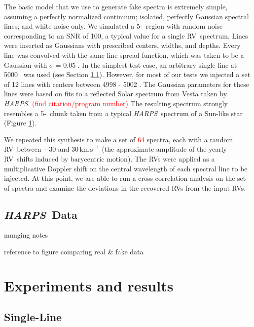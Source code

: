 \documentclass[modern]{aastex61}
\newcommand{\unit}[1]{\mathrm{#1}}
\newcommand{\km}{\unit{km}}
\newcommand{\s}{\unit{s}}
\newcommand{\kms}{\km\,\s^{-1}}
\newcommand{\ang}{\text{\normalfont\AA}}
\newcommand{\todo}[1]{\textcolor{red}{#1}}  %
\newcommand{\acronym}[1]{{\small{#1}}}
\newcommand{\project}[1]{\textsl{#1}}
\newcommand{\HARPS}{\project{\acronym{HARPS}}}
\newcommand{\RV}{\acronym{RV}}
\begin{document}
The basic model that we use to generate fake spectra is extremely simple, assuming a perfectly normalized continuum; isolated, perfectly Gaussian spectral lines; and white noise only. 
We simulated a 5-\ang\ region with random noise corresponding to an SNR of 100, a typical value for a single \RV\ spectrum. 
Lines were inserted as Gaussians with prescribed centers, widths, and depths. 
Every line was convolved with the same line spread function, which was taken to be a Gaussian with $\sigma$ = 0.05 \ang. 
In the simplest test case, an arbitrary single line at 5000 \ang\ was used (see Section \ref{s:singleline}). 
However, for most of our tests we injected a set of 12 lines with centers between 4998 - 5002 \ang. 
The Gaussian parameters for these lines were based on fits to a reflected Solar spectrum from Vesta taken by \HARPS. \todo{(find citation/program number)} 
The resulting spectrum strongly resembles a 5-\ang\ chunk taken from a typical \HARPS\ spectrum of a Sun-like star (Figure \ref{fig:spectra}).

We repeated this synthesis to make a set of \todo{64} spectra, each with a random \RV\ between $-30$ and $30\,\kms$ (the approximate amplitude of the yearly \RV\ shifts induced by barycentric motion). 
The \RV s were applied as a multiplicative Doppler shift on the central wavelength of each spectral line to be injected. 
At this point, we are able to run a cross-correlation analysis on the set of spectra and examine the deviations in the recovered \RV s from the input \RV s.

\begin{figure}
\centering
\caption{}
\label{fig:spectra}
\end{figure}

\subsection{\HARPS\ Data}

munging notes

reference to figure comparing real \& fake data

\section{Experiments and results}
\label{s:experiments}

\subsection{Single-Line}
\label{s:singleline}
\end{document}
